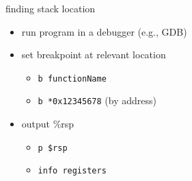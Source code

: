 
\begin{frame}{finding stack location}
\begin{itemize}
\item run program in a debugger (e.g., GDB)
\item set breakpoint at relevant location 
    \begin{itemize}
    \item {\tt b functionName}
    \item {\tt b *0x12345678} (by address)
    \end{itemize}
\item output \%rsp
    \begin{itemize}
    \item {\tt p \$rsp}
    \item {\tt info registers}
    \end{itemize}
\end{itemize}
\end{frame}

